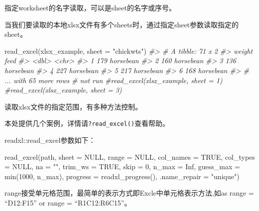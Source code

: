 \documentclass[
]{book}
\newenvironment{Shaded}{\begin{snugshade}}{\end{snugshade}}
\newcommand{\AttributeTok}[1]{\textcolor[rgb]{0.77,0.63,0.00}{#1}}
\newcommand{\CommentTok}[1]{\textcolor[rgb]{0.56,0.35,0.01}{\textit{#1}}}
\newcommand{\ConstantTok}[1]{\textcolor[rgb]{0.00,0.00,0.00}{#1}}
\newcommand{\DecValTok}[1]{\textcolor[rgb]{0.00,0.00,0.81}{#1}}
\newcommand{\FunctionTok}[1]{\textcolor[rgb]{0.00,0.00,0.00}{#1}}
\newcommand{\NormalTok}[1]{#1}
\newcommand{\StringTok}[1]{\textcolor[rgb]{0.31,0.60,0.02}{#1}}
\begin{document}
指定worksheet的名字读取，可以是sheet的名字或序号。

当我们要读取的本地xlsx文件有多个sheets时，通过指定sheet参数读取指定的sheet。

\begin{Shaded}
\begin{Highlighting}[]
\FunctionTok{read\_excel}\NormalTok{(xlsx\_example, }\AttributeTok{sheet =} \StringTok{"chickwts"}\NormalTok{)}
\CommentTok{\#\textgreater{} \# A tibble: 71 x 2}
\CommentTok{\#\textgreater{}   weight feed     }
\CommentTok{\#\textgreater{}    \textless{}dbl\textgreater{} \textless{}chr\textgreater{}    }
\CommentTok{\#\textgreater{} 1    179 horsebean}
\CommentTok{\#\textgreater{} 2    160 horsebean}
\CommentTok{\#\textgreater{} 3    136 horsebean}
\CommentTok{\#\textgreater{} 4    227 horsebean}
\CommentTok{\#\textgreater{} 5    217 horsebean}
\CommentTok{\#\textgreater{} 6    168 horsebean}
\CommentTok{\#\textgreater{} \# ... with 65 more rows}
\CommentTok{\# not run}
\CommentTok{\#read\_excel(xlsx\_example, sheet = 1)}
\CommentTok{\#read\_excel(xlsx\_example, sheet = 3)}
\end{Highlighting}
\end{Shaded}

读取xlsx文件的指定范围，有多种方法控制。

本处提供几个案例，详情请\texttt{?read\_excel()}查看帮助。

readxl::read\_excel参数如下：

\begin{Shaded}
\begin{Highlighting}[]
\FunctionTok{read\_excel}\NormalTok{(path, }\AttributeTok{sheet =} \ConstantTok{NULL}\NormalTok{, }\AttributeTok{range =} \ConstantTok{NULL}\NormalTok{, }\AttributeTok{col\_names =} \ConstantTok{TRUE}\NormalTok{,}
  \AttributeTok{col\_types =} \ConstantTok{NULL}\NormalTok{, }\AttributeTok{na =} \StringTok{""}\NormalTok{, }\AttributeTok{trim\_ws =} \ConstantTok{TRUE}\NormalTok{, }\AttributeTok{skip =} \DecValTok{0}\NormalTok{,}
  \AttributeTok{n\_max =} \ConstantTok{Inf}\NormalTok{, }\AttributeTok{guess\_max =} \FunctionTok{min}\NormalTok{(}\DecValTok{1000}\NormalTok{, n\_max),}
  \AttributeTok{progress =} \FunctionTok{readxl\_progress}\NormalTok{(), }\AttributeTok{.name\_repair =} \StringTok{"unique"}\NormalTok{)}
\end{Highlighting}
\end{Shaded}

range接受单元格范围，最简单的表示方式即Excle中单元格表示方法,如as range = ``D12:F15'' or range = ``R1C12:R6C15''。
\end{document}
